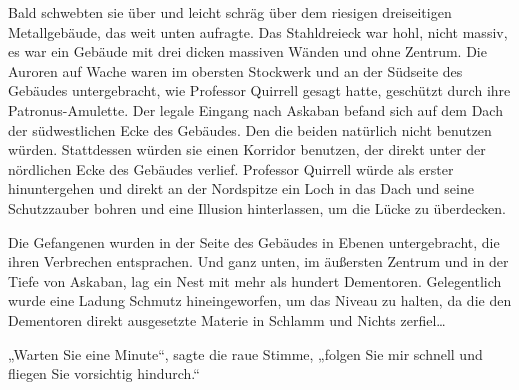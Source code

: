 Bald schwebten sie über und leicht schräg über dem riesigen dreiseitigen Metallgebäude, das weit unten aufragte. Das Stahldreieck war hohl, nicht massiv, es war ein Gebäude mit drei dicken massiven Wänden und ohne Zentrum. Die Auroren auf Wache waren im obersten Stockwerk und an der Südseite des Gebäudes untergebracht, wie Professor Quirrell gesagt hatte, geschützt durch ihre Patronus-Amulette. Der legale Eingang nach Askaban befand sich auf dem Dach der südwestlichen Ecke des Gebäudes. Den die beiden natürlich nicht benutzen würden. Stattdessen würden sie einen Korridor benutzen, der direkt unter der nördlichen Ecke des Gebäudes verlief. Professor Quirrell würde als erster hinuntergehen und direkt an der Nordspitze ein Loch in das Dach und seine Schutzzauber bohren und eine Illusion hinterlassen, um die Lücke zu überdecken.

Die Gefangenen wurden in der Seite des Gebäudes in Ebenen untergebracht, die ihren Verbrechen entsprachen. Und ganz unten, im äußersten Zentrum und in der Tiefe von Askaban, lag ein Nest mit mehr als hundert Dementoren. Gelegentlich wurde eine Ladung Schmutz hineingeworfen, um das Niveau zu halten, da die den Dementoren direkt ausgesetzte Materie in Schlamm und Nichts zerfiel…

„Warten Sie eine Minute“, sagte die raue Stimme, „folgen Sie mir schnell und fliegen Sie vorsichtig hindurch.“

